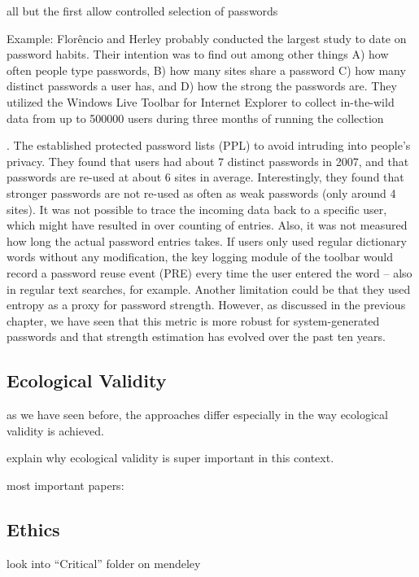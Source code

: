 all but the first allow controlled selection of passwords

Example: 
Flor\^{e}ncio and Herley probably conducted the largest study to date on password habits. Their intention was to find out among other things A) how often people type passwords, B) how many sites share a password C) how many distinct passwords a user has, and D) how the strong the passwords are. They utilized the Windows Live Toolbar for Internet Explorer to collect in-the-wild data from up to 500000 users during three months of running the collection

\cite{Florencio2007LargeScaleStudyPasswordHabits}. The established protected password lists (PPL) to avoid intruding into people's privacy. They found that users had about 7 distinct passwords in 2007, and that passwords are re-used at about 6 sites in average. Interestingly, they found that stronger passwords are not re-used as often as weak passwords (only around 4 sites). It was not possible to trace the incoming data back to a specific user, which might have resulted in over counting of entries. Also, it was not measured how long the actual password entries takes. If users only used regular dictionary words without any modification, the key logging module of the toolbar would record a password reuse event (PRE) every time the user entered the word -- also in regular text searches, for example. Another limitation could be that they used entropy as a proxy for password strength. However, as discussed in the previous chapter, we have seen that this metric is more robust for system-generated passwords and that strength estimation has evolved over the past ten years. 




	\subsection{Ecological Validity}
 as we have seen before, the approaches differ especially in the way ecological validity is achieved.
 
 explain why ecological validity is super important in this context.
 
 most important papers: \cite{Fahl2013EcologicalValidityPasswordStudy, Krol2016ExperimentDesign}
	

	\subsection{Ethics}
	look into ``Critical'' folder on mendeley
	
